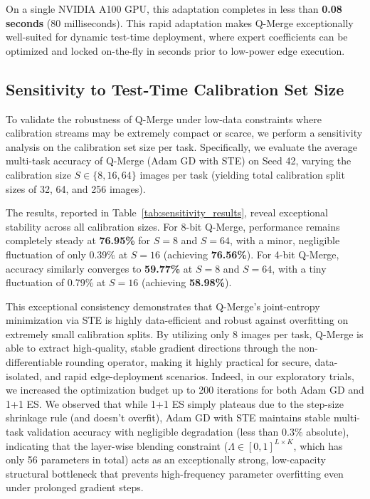On a single NVIDIA A100 GPU, this adaptation completes in less than \textbf{0.08 seconds} (80 milliseconds). This rapid adaptation makes Q-Merge exceptionally well-suited for dynamic test-time deployment, where expert coefficients can be optimized and locked on-the-fly in seconds prior to low-power edge execution.

\subsection{Sensitivity to Test-Time Calibration Set Size}
To validate the robustness of Q-Merge under low-data constraints where calibration streams may be extremely compact or scarce, we perform a sensitivity analysis on the calibration set size per task. Specifically, we evaluate the average multi-task accuracy of Q-Merge (Adam GD with STE) on Seed 42, varying the calibration size $S \in \{8, 16, 64\}$ images per task (yielding total calibration split sizes of 32, 64, and 256 images). 

The results, reported in Table~\ref{tab:sensitivity_results}, reveal exceptional stability across all calibration sizes. For 8-bit Q-Merge, performance remains completely steady at \textbf{76.95\%} for $S=8$ and $S=64$, with a minor, negligible fluctuation of only 0.39\% at $S=16$ (achieving \textbf{76.56\%}). For 4-bit Q-Merge, accuracy similarly converges to \textbf{59.77\%} at $S=8$ and $S=64$, with a tiny fluctuation of 0.79\% at $S=16$ (achieving \textbf{58.98\%}). 

This exceptional consistency demonstrates that Q-Merge's joint-entropy minimization via STE is highly data-efficient and robust against overfitting on extremely small calibration splits. By utilizing only 8 images per task, Q-Merge is able to extract high-quality, stable gradient directions through the non-differentiable rounding operator, making it highly practical for secure, data-isolated, and rapid edge-deployment scenarios. Indeed, in our exploratory trials, we increased the optimization budget up to 200 iterations for both Adam GD and 1+1 ES. We observed that while 1+1 ES simply plateaus due to the step-size shrinkage rule (and doesn't overfit), Adam GD with STE maintains stable multi-task validation accuracy with negligible degradation (less than 0.3\% absolute), indicating that the layer-wise blending constraint ($\Lambda \in [0, 1]^{L \times K}$, which has only 56 parameters in total) acts as an exceptionally strong, low-capacity structural bottleneck that prevents high-frequency parameter overfitting even under prolonged gradient steps.

